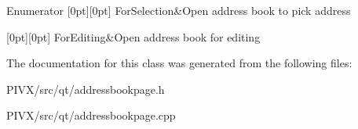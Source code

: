 \begin{DoxyEnumFields}{Enumerator}
[0pt][0pt]{}\mbox{\label{class_address_book_page_a0a8f8e590dc6f18e829fde039f984464aaadd19edc662b5516c378a7cc8599fdb}} 
For\+Selection&Open address book to pick address \\
\hline

[0pt][0pt]{}\mbox{\label{class_address_book_page_a0a8f8e590dc6f18e829fde039f984464a86b6565fcddce6edf578c0e470471296}} 
For\+Editing&Open address book for editing \\
\hline

\end{DoxyEnumFields}


The documentation for this class was generated from the following files\+:\begin{DoxyCompactItemize}
\item 
P\+I\+V\+X/src/qt/addressbookpage.\+h\item 
P\+I\+V\+X/src/qt/addressbookpage.\+cpp\end{DoxyCompactItemize}
